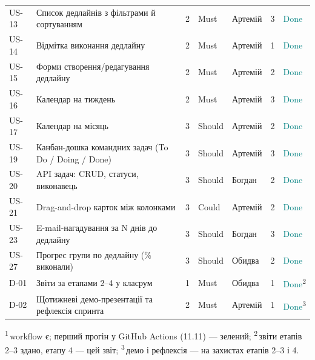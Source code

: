 \begin{longtable}{@{}l L{5.0cm} c l l r l@{}}
US-13 & Список дедлайнів з фільтрами й сортуванням & 2 & Must & Артемій & 3 & \textcolor{teal}{Done}\\
US-14 & Відмітка виконання дедлайну & 2 & Must & Артемій & 1 & \textcolor{teal}{Done}\\
US-15 & Форми створення/редагування дедлайну & 2 & Must & Артемій & 2 & \textcolor{teal}{Done}\\
US-16 & Календар на тиждень & 2 & Must & Артемій & 3 & \textcolor{teal}{Done}\\
US-17 & Календар на місяць & 3 & Should & Артемій & 2 & \textcolor{teal}{Done}\\
US-19 & Канбан-дошка командних задач (To Do / Doing / Done) & 3 & Should & Артемій & 3 & \textcolor{teal}{Done}\\
US-20 & API задач: CRUD, статуси, виконавець & 3 & Should & Богдан & 2 & \textcolor{teal}{Done}\\
US-21 & Drag-and-drop карток між колонками & 3 & Could & Артемій & 2 & \textcolor{teal}{Done}\\
US-23 & E-mail-нагадування за N днів до дедлайну & 3 & Should & Богдан & 3 & \textcolor{teal}{Done}\\
US-27 & Прогрес групи по дедлайну (\% виконали) & 3 & Should & Обидва & 2 & \textcolor{teal}{Done}\\
D-01 & Звіти за етапами 2–4 у класрум & 1 & Must & Обидва & 1 & \textcolor{teal}{Done}\textsuperscript{2}\\
D-02 & Щотижневі демо-презентації та рефлексія спринта & 2 & Must & Артемій & 1 & \textcolor{teal}{Done}\textsuperscript{3}\\
\bottomrule
\end{longtable}
{\small \textsuperscript{1}\,workflow є; перший прогін у GitHub Actions (11.11) — зелений; \textsuperscript{2}\,звіти етапів 2–3 здано, етапу 4 — цей звіт; \textsuperscript{3}\,демо і рефлексія — на захистах етапів 2–3 і 4.}
